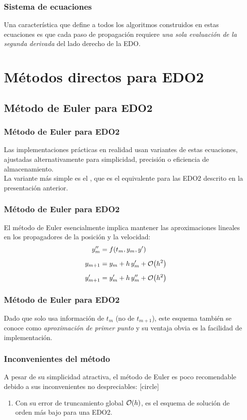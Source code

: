 \begin{frame}
\frametitle{Sistema de ecuaciones}
Una característica que define a todos los algoritmos construidos en estas ecuaciones es que cada paso de propagación requiere \emph{una sola evaluación de la segunda derivada} del lado derecho de la EDO.
\end{frame}
\section{Métodos directos para EDO2}
\subsection{Método de Euler para EDO2}
\begin{frame}
\frametitle{Método de Euler para EDO2}
Las implementaciones prácticas en realidad usan variantes de estas ecuaciones, ajustadas alternativamente para simplicidad, precisión o eficiencia de almacenamiento.
\\
\bigskip
La variante más simple es el , que es el equivalente para las EDO2 descrito en la presentación anterior.
\end{frame}
\begin{frame}
\frametitle{Método de Euler para EDO2}
El método de Euler esencialmente implica mantener las aproximaciones lineales en los propagadores de la posición y la velocidad:
\begin{align}
\begin{aligned}
\stilde{y}_{m} &= f(t_{m}, y_{m}, \ptilde{y}) \\[0.5em]
y_{m+1} &= y_{m} + h \, \ptilde{y}_{m} + \order{h^{2}} \\[0.5em]
\ptilde{y}_{m+1} &= \ptilde{y}_{m} + h \, \stilde{y}_{m} + \order{h^{2}}
\end{aligned}
\label{eq:eq:ecuacion_12_57}
\end{align}
\end{frame}
\begin{frame}
\frametitle{Método de Euler para EDO2}
Dado que solo usa información de $t_{m}$ (no de $t_{m + 1}$), este esquema también se conoce como \emph{aproximación de primer punto} y su ventaja obvia es la facilidad de implementación.
\end{frame}
\begin{frame}
\frametitle{Inconvenientes del método}
A pesar de su simplicidad atractiva, el método de Euler es poco recomendable debido a sus inconvenientes no despreciables:
[circle]
\begin{enumerate}
\item Con su error de truncamiento global $\order{h}$, es el esquema de solución de orden más bajo para una EDO2.
\seti
\end{enumerate}
\end{frame}
